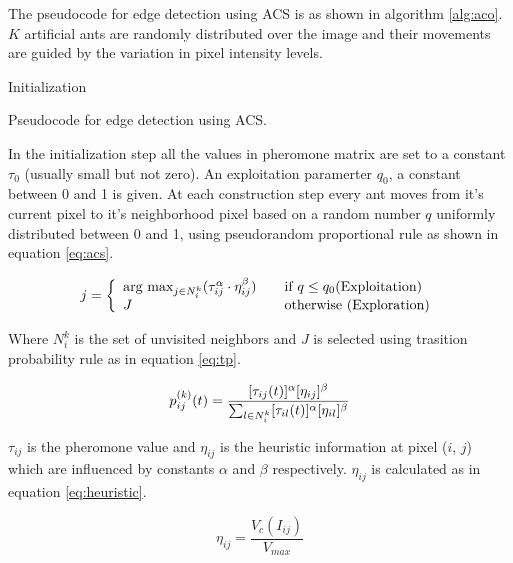 \documentclass{llncs}
\begin{document}
	The pseudocode for edge detection using ACS is as shown in algorithm \ref{alg:aco}. $K$ artificial ants are randomly distributed over the image and their movements are guided by the variation in pixel intensity levels.
	
	\begin{algorithm}
		Initialization\;
	\caption{Pseudocode for edge detection using ACS.\cite{Anna:2010}}\label{alg:aco}
	\end{algorithm}
	
	In the initialization step all the values in pheromone matrix are set to a constant $\tau_{0}$ (usually small but not zero). An exploitation paramerter $q_0$, a constant between 0 and 1 is given. At each construction step every ant moves from it's current pixel to it's neighborhood pixel based on a random number $q$ uniformly distributed between 0 and 1, using pseudorandom proportional rule as shown in equation \eqref{eq:acs}.
	
	\begin{equation}
		\centering
		j = \left\{
		\begin{array}{l l}
		\text{arg max}_{j \in N_i^k} (\tau_{ij}^{\alpha} \cdot \eta_{ij}^{\beta}) & \quad \text{if } q \leq q_0 \text{(Exploitation)}\\
		J & \quad \text{otherwise (Exploration)}
		\end{array} \right.
		\label{eq:acs}
	\end{equation}
	
	Where $N_i^k$ is the set of unvisited neighbors and $J$ is selected using trasition probability rule as in equation \eqref{eq:tp}.
	
	\begin{equation}
		\centering
		p^{(k)}_{ij}(t)  = \frac{[\tau_{ij}(t)]^\alpha[\eta_{ij}]^\beta}
		{\sum_{l \in N_i^k} [\tau_{il}(t)]^\alpha [\eta_{il}]^\beta}
		\label{eq:tp}
	\end{equation}
	
	$\tau_{ij}$ is the pheromone value and $\eta_{ij}$ is the heuristic information at pixel ($i$, $j$) which are influenced by constants $\alpha$ and $\beta$ respectively. $\eta_{ij}$ is calculated as in equation \eqref{eq:heuristic}.
	
	\begin{equation}
		\eta_{ij} = \frac{V_c(I_{ij})}{V_{max}}
		\label{eq:heuristic}
	\end{equation}
	
\end{document}
